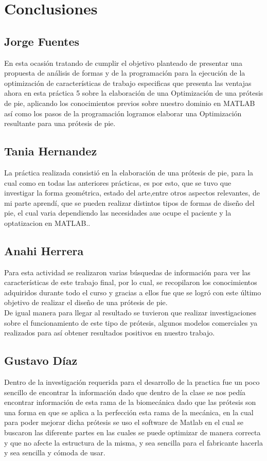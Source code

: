 \documentclass{article}
\begin{document}
\section{Conclusiones}
\subsection{Jorge  Fuentes}
En esta ocasión tratando de cumplir el objetivo planteado de presentar una propuesta de análisis de formas y de la programación para la ejecución de la optimización de características de trabajo especificas que presenta las ventajas ahora en esta práctica 5 sobre la elaboración de una Optimización de una prótesis de pie, aplicando los conocimientos previos sobre nuestro dominio en MATLAB así como los pasos de la programación logramos elaborar una Optimización resultante para una prótesis de pie.
\subsection{Tania  Hernandez}
La práctica realizada consistió en la elaboración de una prótesis de pie, para la cual como en todas las anteriores prácticas, es por esto, que se tuvo que investigar la forma geométrica,  estado del arte,entre otros aspectos relevantes, de mi parte aprendí, que se pueden realizar distintos tipos de formas de diseño del pie, el cual varia dependiendo las necesidades aue ocupe el paciente y la optatizacion en MATLAB..
\subsection{Anahi Herrera}
Para esta actividad se realizaron varias búsquedas de información para ver las características de este trabajo final, por lo cual, se recopilaron los conocimientos adquiridos durante todo el curso y gracias a ellos fue que se logró con este último objetivo de realizar el diseño de una prótesis de pie.\\ 
De igual manera para llegar al resultado se tuvieron que realizar investigaciones sobre el funcionamiento de este tipo de prótesis, algunos modelos comerciales ya realizados para así obtener resultados positivos en nuestro trabajo. 

\subsection{Gustavo  Díaz}
Dentro de la investigación requerida para el desarrollo de la practica fue un poco sencillo de encontrar la información dado que dentro de la clase se nos pedía encontrar información de esta rama de la biomecánica dado que las prótesis son una forma en que se aplica a la perfección esta rama de la mecánica, en la cual para poder mejorar dicha prótesis se uso el software de Matlab en el cual se buscaron las diferente partes en las cuales se puede optimizar de manera correcta y que no afecte la estructura de la misma, y sea sencilla para el fabricante hacerla y sea sencilla y cómoda de usar. 
\end{document}
